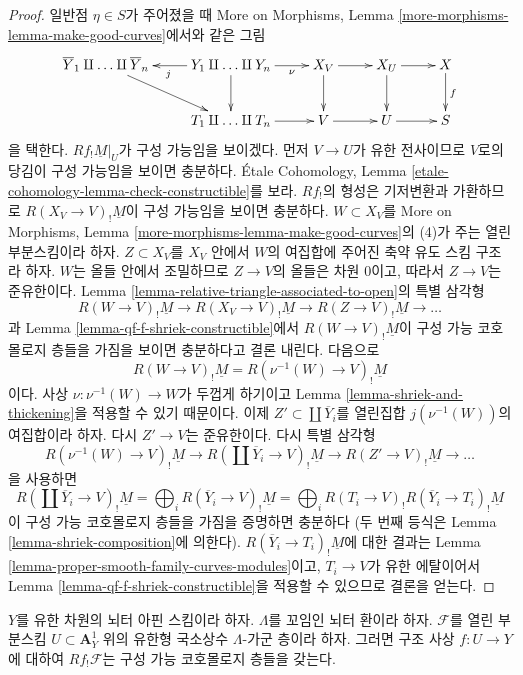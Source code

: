 \begin{proof}
\medskip\noindent
일반점 $\eta \in S$가 주어졌을 때 More on Morphisms, Lemma
\ref{more-morphisms-lemma-make-good-curves}에서와 같은 그림
$$
\xymatrix{
\overline{Y}_1 \amalg \ldots \amalg \overline{Y}_n \ar[rd] &
Y_1 \amalg \ldots \amalg Y_n \ar[r]_-\nu \ar[d] \ar[l]^j &
X_V \ar[r] \ar[d] &
X_U \ar[r] \ar[d] &
X \ar[d]^f \\
& T_1 \amalg \ldots \amalg T_n \ar[r] &
V \ar[r] &
U \ar[r] &
S
}
$$
을 택한다. $Rf_!\underline{M}|_U$가 구성 가능임을 보이겠다.
먼저 $V \to U$가 유한 전사이므로 $V$로의 당김이 구성 가능임을
보이면 충분하다. \'Etale Cohomology, Lemma
\ref{etale-cohomology-lemma-check-constructible}를 보라.
$Rf_!$의 형성은 기저변환과 가환하므로
$R(X_V \to V)_!\underline{M}$이 구성 가능임을 보이면 충분하다.
$W \subset X_V$를 More on Morphisms, Lemma
\ref{more-morphisms-lemma-make-good-curves}의 (4)가 주는 열린
부분스킴이라 하자. $Z \subset X_V$를 $X_V$ 안에서 $W$의 여집합에
주어진 축약 유도 스킴 구조라 하자. $W$는 올들 안에서 조밀하므로
$Z \to V$의 올들은 차원 $0$이고, 따라서 $Z \to V$는 준유한이다.
Lemma \ref{lemma-relative-triangle-associated-to-open}의 특별 삼각형
$$
R(W \to V)_!\underline{M} \to
R(X_V \to V)_!\underline{M} \to
R(Z \to V)_!\underline{M} \to
\ldots
$$
과 Lemma \ref{lemma-qf-f-shriek-constructible}에서
$R(W \to V)_!\underline{M}$이 구성 가능 코호몰로지 층들을 가짐을
보이면 충분하다고 결론 내린다.
다음으로
$$
R(W \to V)_!\underline{M} = R(\nu^{-1}(W) \to V)_!\underline{M}
$$
이다. 사상 $\nu : \nu^{-1}(W) \to W$가 두껍게 하기이고
Lemma \ref{lemma-shriek-and-thickening}을 적용할 수 있기 때문이다.
이제 $Z' \subset \coprod \overline{Y}_i$를 열린집합
$j(\nu^{-1}(W))$의 여집합이라 하자. 다시 $Z' \to V$는 준유한이다.
다시 특별 삼각형
$$
R(\nu^{-1}(W) \to V)_!\underline{M} \to
R(\coprod \overline{Y}_i \to V)_!\underline{M} \to
R(Z' \to V)_!\underline{M} \to
\ldots
$$
을 사용하면
$$
R(\coprod \overline{Y}_i \to V)_!\underline{M} =
\bigoplus\nolimits_i R(\overline{Y}_i \to V)_!\underline{M} =
\bigoplus\nolimits_i R(T_i \to V)_!R(\overline{Y}_i \to T_i)_!\underline{M}
$$
이 구성 가능 코호몰로지 층들을 가짐을 증명하면 충분하다
(두 번째 등식은 Lemma \ref{lemma-shriek-composition}에 의한다).
$R(\overline{Y}_i \to T_i)_!\underline{M}$에 대한 결과는 Lemma
\ref{lemma-proper-smooth-family-curves-modules}이고,
$T_i \to V$가 유한 에탈이어서 Lemma
\ref{lemma-qf-f-shriek-constructible}을 적용할 수 있으므로 결론을
얻는다.
\end{proof}


\begin{lemma}
\label{lemma-loc-constant-shriek-rel-dim-1}
$Y$를 유한 차원의 뇌터 아핀 스킴이라 하자.
$\Lambda$를 꼬임인 뇌터 환이라 하자.
$\mathcal{F}$를 열린 부분스킴
$U \subset \mathbf{A}^1_Y$ 위의 유한형 국소상수
$\Lambda$-가군 층이라 하자. 그러면 구조 사상
$f : U \to Y$에 대하여 $Rf_!\mathcal{F}$는 구성 가능 코호몰로지
층들을 갖는다.
\end{lemma}

